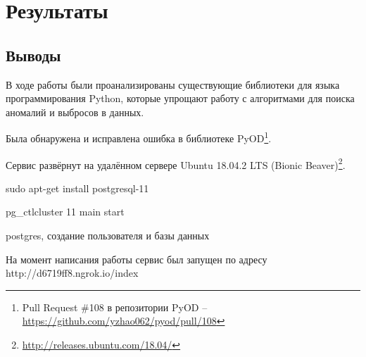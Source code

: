 \chapter{Результаты} \label{ch:ch5}

\section{Выводы} \label{ch:ch5/sect1}

В ходе работы были проанализированы существующие библиотеки для языка программирования Python, которые упрощают работу с алгоритмами для поиска аномалий и выбросов в данных.

Была обнаружена и исправлена ошибка в библиотеке PyOD\footnote{Pull Request \#108 в репозитории PyOD -- \url{https://github.com/yzhao062/pyod/pull/108}}.

Сервис развёрнут на удалённом сервере Ubuntu 18.04.2 LTS (Bionic Beaver)\footnote{\url{http://releases.ubuntu.com/18.04/}}.

sudo apt-get install postgresql-11

pg\_ctlcluster 11 main start

postgres, создание пользователя и базы данных

На момент написания работы сервис был запущен по адресу http://d6719ff8.ngrok.io/index

\clearpage
